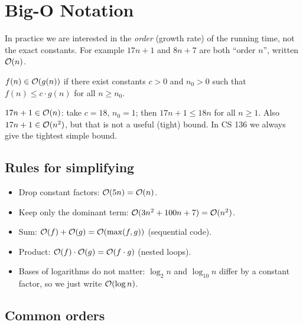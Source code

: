 \section{Big-O Notation}

In practice we are interested in the \emph{order} (growth rate) of the running time, not the
exact constants. For example $17n + 1$ and $8n + 7$ are both ``order $n$'', written $\mathcal{O}(n)$.

\begin{definition}
$f(n) \in \mathcal{O}(g(n))$ if there exist constants $c > 0$ and $n_0 > 0$ such that
$f(n) \le c \cdot g(n)$ for all $n \ge n_0$.
\end{definition}

\begin{example}
$17n + 1 \in \mathcal{O}(n)$: take $c = 18$, $n_0 = 1$; then $17n + 1 \le 18n$ for all $n \ge 1$.
Also $17n + 1 \in \mathcal{O}(n^2)$, but that is not a useful (tight) bound. In CS 136 we always give
the tightest simple bound.
\end{example}

\subsection{Rules for simplifying}
\begin{itemize}
  \item Drop constant factors: $\mathcal{O}(5n) = \mathcal{O}(n)$.
  \item Keep only the dominant term: $\mathcal{O}(3n^2 + 100n + 7) = \mathcal{O}(n^2)$.
  \item Sum: $\mathcal{O}(f) + \mathcal{O}(g) = \mathcal{O}(\max(f, g))$ (sequential code).
  \item Product: $\mathcal{O}(f) \cdot \mathcal{O}(g) = \mathcal{O}(f \cdot g)$ (nested loops).
  \item Bases of logarithms do not matter: $\log_2 n$ and $\log_{10} n$ differ by a constant
    factor, so we just write $\mathcal{O}(\log n)$.
\end{itemize}

\subsection{Common orders}

